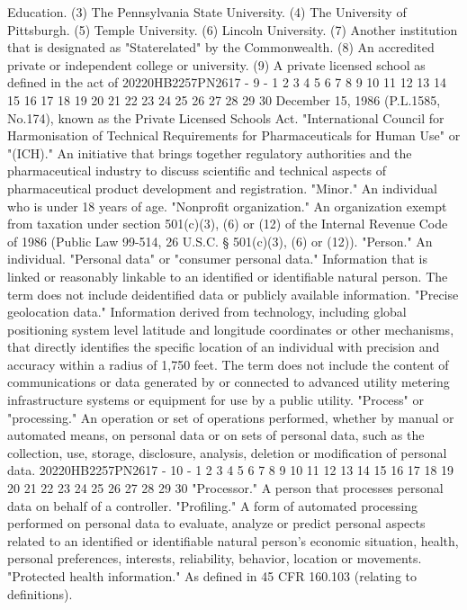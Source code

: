 Education.
(3) The Pennsylvania State University.
(4) The University of Pittsburgh.
(5) Temple University.
(6) Lincoln University.
(7) Another institution that is designated as "Staterelated" by the Commonwealth.
(8) An accredited private or independent college or
university.
(9) A private licensed school as defined in the act of
20220HB2257PN2617 - 9 -
1
2
3
4
5
6
7
8
9
10
11
12
13
14
15
16
17
18
19
20
21
22
23
24
25
26
27
28
29
30
December 15, 1986 (P.L.1585, No.174), known as the Private
Licensed Schools Act.
"International Council for Harmonisation of Technical
Requirements for Pharmaceuticals for Human Use" or "(ICH)." An
initiative that brings together regulatory authorities and the
pharmaceutical industry to discuss scientific and technical
aspects of pharmaceutical product development and registration.
"Minor." An individual who is under 18 years of age.
"Nonprofit organization." An organization exempt from
taxation under section 501(c)(3), (6) or (12) of the Internal
Revenue Code of 1986 (Public Law 99-514, 26 U.S.C. § 501(c)(3),
(6) or (12)).
"Person." An individual.
"Personal data" or "consumer personal data." Information
that is linked or reasonably linkable to an identified or
identifiable natural person. The term does not include deidentified data or publicly available information.
"Precise geolocation data." Information derived from
technology, including global positioning system level latitude
and longitude coordinates or other mechanisms, that directly
identifies the specific location of an individual with precision
and accuracy within a radius of 1,750 feet. The term does not
include the content of communications or data generated by or
connected to advanced utility metering infrastructure systems or
equipment for use by a public utility.
"Process" or "processing." An operation or set of operations
performed, whether by manual or automated means, on personal
data or on sets of personal data, such as the collection, use,
storage, disclosure, analysis, deletion or modification of
personal data.
20220HB2257PN2617 - 10 -
1
2
3
4
5
6
7
8
9
10
11
12
13
14
15
16
17
18
19
20
21
22
23
24
25
26
27
28
29
30
"Processor." A person that processes personal data on behalf
of a controller.
"Profiling." A form of automated processing performed on
personal data to evaluate, analyze or predict personal aspects
related to an identified or identifiable natural person's
economic situation, health, personal preferences, interests,
reliability, behavior, location or movements.
"Protected health information." As defined in 45 CFR 160.103
(relating to definitions).

